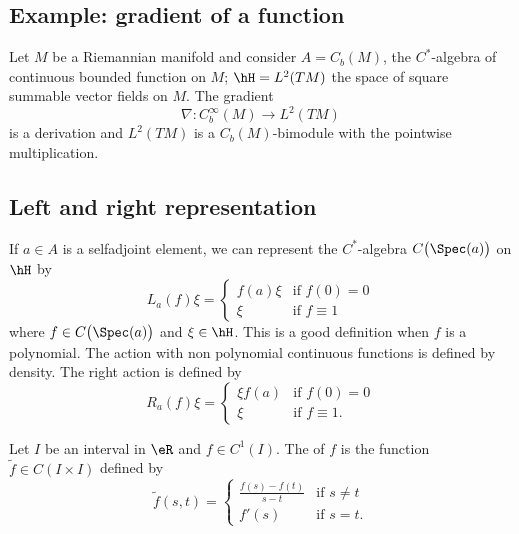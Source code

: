 \subsection{Example: gradient of a function}

Let $M$ be a Riemannian manifold and consider $A=C_b(M)$, the $C^*$-algebra of continuous bounded function on $M$; $\hH=L^2(TM)$ the space of square summable vector fields on $M$. The gradient
\begin{equation}
	\nabla\colon C^{\infty}_b(M)\to L^2(TM)
\end{equation}
is a derivation and $L^2(TM)$ is a $C_b(M)$-bimodule with the pointwise multiplication.

\subsection{Left and right representation}

If $a\in A$ is a selfadjoint element, we can represent the $C^*$-algebra $C\big( \Spec(a) \big)$ on $\hH$ by
\begin{equation}
	L_a(f)\xi=\begin{cases}
		f(a)\xi	&	\text{if $f(0)=0$}\\
		\xi	&	 \text{if $f\equiv 1$}
	\end{cases}
\end{equation}
where $f\in C\big( \Spec(a) \big)$ and $\xi\in\hH$. This is a good definition when $f$ is a polynomial. The action with non polynomial continuous functions is defined by density. The right action is defined by
\begin{equation}
	R_a(f)\xi=\begin{cases}
		\xi f(a)	&	\text{if $f(0)=0$}\\
		\xi	&	 \text{if $f\equiv 1$}.
	\end{cases}
\end{equation}

Let \(I\) be an interval in \(\eR\) and \(f\in C^1(I)\). The  of \(f\) is the function \(\tilde f\in C(I\times I)\) defined by
\begin{equation}
    \tilde f(s,t)=\begin{cases}
        \frac{ f(s)-f(t) }{ s-t }    &   \text{if \(s\neq t\)}\\
        f'(s)    &    \text{if \(s=t\)}.
    \end{cases}
\end{equation}

